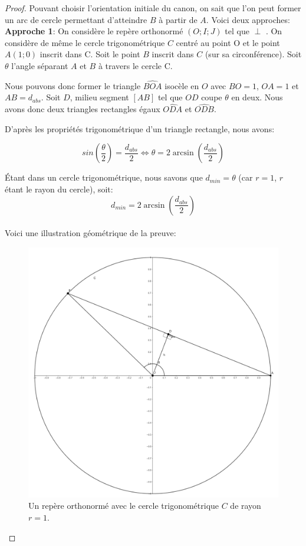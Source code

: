 \documentclass[a4paper]{amsart}
\theoremstyle{definition}
\theoremstyle{remark}
\numberwithin{equation}{section}
\renewcommand*{\overrightarrow}[1]{\vbox{\halign{##\cr 
  \tiny\rightarrowfill\cr\noalign{\nointerlineskip\vskip1pt} 
  $#1\mskip2mu$\cr}}}
\begin{document}
\begin{proof}
  Pouvant choisir l'orientation initiale du canon, on sait que l'on peut former un arc de cercle permettant d'atteindre $B$ à partir de $A$.
  Voici deux approches:\\

  \textbf{Approche 1}: On considère le repère orthonormé $(O;I;J)$ tel que \overrightarrow{OI} $\perp$ \overrightarrow{OJ}. On considère de même le cercle trigonométrique $C$ centré au point O et le point $A(1;0)$ inscrit dans C. Soit le point
  $B$ inscrit dans $C$ (sur sa circonférence).
  Soit $\theta$ l'angle séparant $A$ et $B$ à travers le cercle C.

  Nous pouvons donc former le triangle $\widehat{BOA}$ isocèle en $O$ avec $BO=1$, $OA=1$ et $AB=d_{abs}$. Soit $D$, milieu segment $[AB]$ tel que $OD$ coupe $\theta$ en deux. Nous avons donc deux triangles rectangles égaux $\widehat{ODA}$ et $\widehat{ODB}$.

  D'après les propriétés trigonométrique d'un triangle rectangle, nous avons:

  \[sin(\frac{\theta}{2})=\frac{d_{abs}}{2} \Leftrightarrow \theta = 2\arcsin (\frac{d_{abs}}{2})\]

  Étant dans un cercle trigonométrique, nous savons que $d_{min}=\theta$ (car $r=1$, $r$ étant le rayon du cercle), soit:
  \[d_{min}=2\arcsin (\frac{d_{abs}}{2})\] \\

  Voici une illustration géométrique de la preuve:

  \begin{figure}[H]
    \centering
    \includegraphics[scale=0.17]{images/angle.png}
    \caption{Un repère orthonormé avec le cercle trigonométrique $C$ de rayon $r=1$.}
  \end{figure}


\end{proof}
\end{document}
